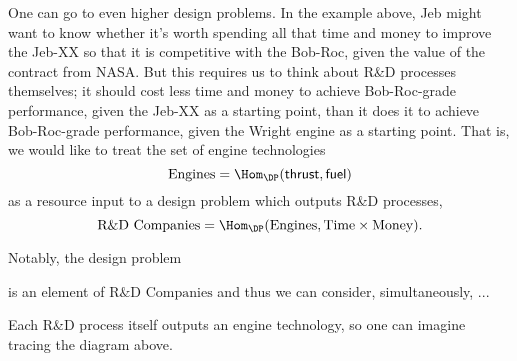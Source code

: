 One can go to even higher design problems. In the example above, Jeb might want to know whether it's worth spending all that time and money to improve the Jeb-XX so that it is competitive with the Bob-Roc, given the value of the contract from NASA. But this requires us to think about R\&D processes themselves; \ie  it should cost less time and money to achieve Bob-Roc-grade performance, given the Jeb-XX as a starting point, than it does it to achieve Bob-Roc-grade performance, given the Wright engine as a starting point. That is, we would like to treat the set of engine technologies
\[\text{Engines} = \Hom_\DP(\mathsf{thrust}, \mathsf{fuel})\]
as a resource input to a design problem which outputs R\&D processes,
\[\text{R\&D Companies} = \Hom_\DP(\text{Engines}, \text{Time} \times \text{Money}).\]

Notably, the design problem
\begin{center}
\end{center}
is an element of $\text{R\&D Companies}$ and thus we can consider, simultaneously, ...
\begin{center}
\end{center}
Each R\&D process itself outputs an engine technology, so one can imagine tracing the diagram above.
